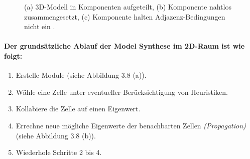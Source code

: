 \documentclass[12pt, a4paper,twoside,openany]{report} %
\begin{document}
\begin{figure}[H]
    \centering
    \qquad
    \qquad
    \caption{(a) 3D-Modell in Komponenten aufgeteilt, (b) Komponente nahtlos zusammengesetzt, (c) Komponente halten Adjazenz-Bedingungen nicht ein \cite{merrell2009model}.}%
\end{figure}

\paragraph{Der grundsätzliche Ablauf der Model Synthese im 2D-Raum ist wie folgt:}

\begin{enumerate}
    \itemsep-1em
    \item Erstelle Module {(siehe Abbildung 3.8 (a))}.
    \item Wähle eine Zelle unter eventueller Berücksichtigung von Heuristiken.
    \item Kollabiere die Zelle auf einen Eigenwert.
    \item Errechne neue mögliche Eigenwerte der benachbarten Zellen \textit{(Propagation)}  {(siehe Abbildung 3.8 (b))}.
    \item Wiederhole Schritte 2 bis 4.
\end{enumerate}
\end{document}
